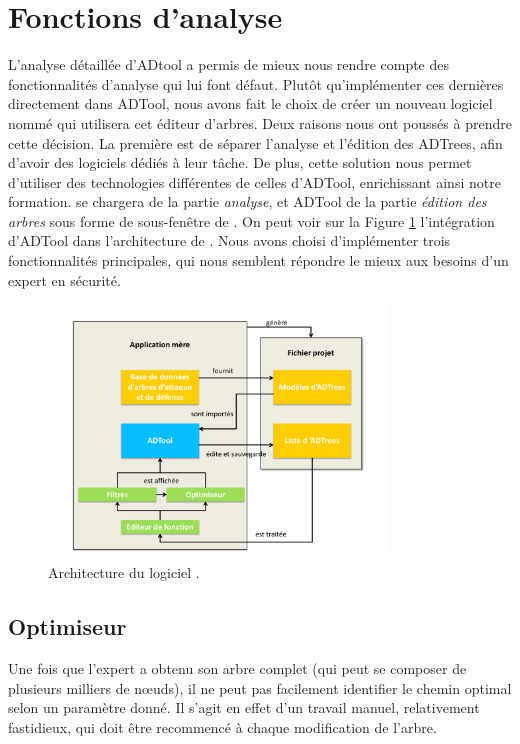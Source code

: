 \section{Fonctions d'analyse}
	L'analyse détaillée d'ADtool a permis de mieux nous rendre compte des fonctionnalités d'analyse qui lui font défaut. Plutôt qu'implémenter ces dernières directement dans ADTool, nous avons fait le choix de créer un nouveau logiciel nommé \glasir{} qui utilisera cet éditeur d'arbres. Deux raisons nous ont poussés à prendre cette décision. La première est de séparer l'analyse et l'édition des ADTrees, afin d'avoir des logiciels dédiés à leur tâche. De plus, cette solution nous permet d'utiliser des technologies différentes de celles d'ADTool, enrichissant ainsi notre formation. \glasir{} se chargera de la partie \textit{analyse}, et ADTool de la partie \textit{édition des arbres} sous forme de sous-fenêtre de \glasir{}. On peut voir sur la {\sc Figure} \ref{fig:architecture_Glasir} l'intégration d'ADTool dans l'architecture de \glasir{}. Nous avons choisi d'implémenter trois fonctionnalités principales, qui nous semblent répondre le mieux aux besoins d'un expert en sécurité.

	\begin{figure}[h!]
		\centering
			\includegraphics[width=0.8\textwidth]{figure/archiGlasir.pdf}
		\caption{Architecture du logiciel \glasir.}
		\label{fig:architecture_Glasir}
	\end{figure}

	\subsection{Optimiseur}
		\label{subsection:optimiseur}

		Une fois que l'expert a obtenu son arbre complet (qui peut se composer de plusieurs milliers de nœuds), il ne peut pas facilement identifier le chemin optimal selon un paramètre donné. Il s'agit en effet d'un travail manuel, relativement fastidieux, qui doit être recommencé à chaque modification de l'arbre.
		
